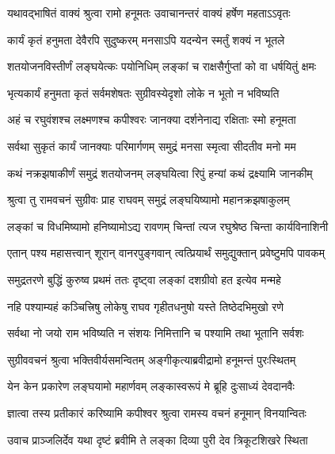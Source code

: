 



\twolineshloka
{यथावद्भाषितं वाक्यं श्रुत्वा रामो हनूमतः}
{उवाचानन्तरं वाक्यं हर्षेण महताऽऽवृतः} %

\twolineshloka
{कार्यं कृतं हनुमता देवैरपि सुदुष्करम्}
{मनसाऽपि यदन्येन स्मर्तुं शक्यं न भूतले} %

\twolineshloka
{शतयोजनविस्तीर्णं लङ्घयेत्कः पयोनिधिम्}
{लङ्कां च राक्षसैर्गुप्तां को वा धर्षयितुं क्षमः} %

\twolineshloka
{भृत्यकार्यं हनुमता कृतं सर्वमशेषतः}
{सुग्रीवस्येदृशो लोके न भूतो न भविष्यति} %

\twolineshloka
{अहं च रघुवंशश्च लक्ष्मणश्च कपीश्वरः}
{जानक्या दर्शनेनाद्य रक्षिताः स्मो हनूमता} %

\twolineshloka
{सर्वथा सुकृतं कार्यं जानक्याः परिमार्गणम्}
{समुद्रं मनसा स्मृत्वा सीदतीव मनो मम} %

\twolineshloka
{कथं नक्रझषाकीर्णं समुद्रं शतयोजनम्}
{लङ्घयित्वा रिपुं हन्यां कथं द्रक्ष्यामि जानकीम्} %

\twolineshloka
{श्रुत्वा तु रामवचनं सुग्रीवः प्राह राघवम्}
{समुद्रं लङ्घयिष्यामो महानक्रझषाकुलम्} %

\twolineshloka
{लङ्कां च विधमिष्यामो हनिष्यामोऽद्य रावणम्}
{चिन्तां त्यज रघुश्रेष्ठ चिन्ता कार्यविनाशिनी} %

\twolineshloka
{एतान् पश्य महासत्त्वान् शूरान् वानरपुङ्गवान्}
{त्वत्प्रियार्थं समुद्युक्तान् प्रवेष्टुमपि पावकम्} %

\twolineshloka
{समुद्रतरणे बुद्धिं कुरुष्व प्रथमं ततः}
{दृष्ट्वा लङ्कां दशग्रीवो हत इत्येव मन्महे} %

\twolineshloka
{नहि पश्याम्यहं कञ्चित्त्रिषु लोकेषु राघव}
{गृहीतधनुषो यस्ते तिष्ठेदभिमुखो रणे} %

\twolineshloka
{सर्वथा नो जयो राम भविष्यति न संशयः}
{निमित्तानि च पश्यामि तथा भूतानि सर्वशः} %

\twolineshloka
{सुग्रीववचनं श्रुत्वा भक्तिवीर्यसमन्वितम्}
{अङ्गीकृत्याब्रवीद्रामो हनूमन्तं पुरःस्थितम्} %

\twolineshloka
{येन केन प्रकारेण लङ्घयामो महार्णवम्}
{लङ्कास्वरूपं मे ब्रूहि दुःसाध्यं देवदानवैः} %

\twolineshloka
{ज्ञात्वा तस्य प्रतीकारं करिष्यामि कपीश्वर}
{श्रुत्वा रामस्य वचनं हनूमान् विनयान्वितः} %

\twolineshloka
{उवाच प्राञ्जलिर्देव यथा दृष्टं ब्रवीमि ते}
{लङ्का दिव्या पुरी देव त्रिकूटशिखरे स्थिता} %

